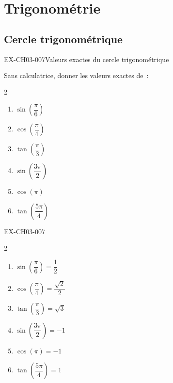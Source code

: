 \chapter{Trigonométrie}

\section{Cercle trigonométrique}
\begin{exercice}{EX-CH03-007}{Valeurs exactes du cercle trigonométrique}

Sans calculatrice, donner les valeurs exactes de~:

\begin{multicols}{2}
\begin{enumerate}[label=\alph*)]
  \item $\sin\!\left(\dfrac{\pi}{6}\right)$
  \item $\cos\!\left(\dfrac{\pi}{4}\right)$
  \item $\tan\!\left(\dfrac{\pi}{3}\right)$
  \item $\sin\!\left(\dfrac{3\pi}{2}\right)$
  \item $\cos(\pi)$
  \item $\tan\!\left(\dfrac{5\pi}{4}\right)$
\end{enumerate}
\end{multicols}

\end{exercice}
\begin{solution}{EX-CH03-007}

\begin{multicols}{2}
\begin{enumerate}[label=\alph*)]
  \item $\sin\!\left(\dfrac{\pi}{6}\right) = \dfrac{1}{2}$
  \item $\cos\!\left(\dfrac{\pi}{4}\right) = \dfrac{\sqrt{2}}{2}$
  \item $\tan\!\left(\dfrac{\pi}{3}\right) = \sqrt{3}$
  \item $\sin\!\left(\dfrac{3\pi}{2}\right) = -1$
  \item $\cos(\pi) = -1$
  \item $\tan\!\left(\dfrac{5\pi}{4}\right) = 1$
\end{enumerate}
\end{multicols}

\end{solution}
